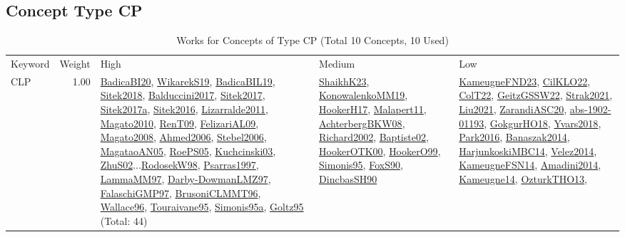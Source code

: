 \subsection{Concept Type CP}
\label{sec:CP}
\label{CP}
{\scriptsize
\begin{longtable}{p{3cm}r>{\raggedright\arraybackslash}p{6cm}>{\raggedright\arraybackslash}p{6cm}>{\raggedright\arraybackslash}p{8cm}}
\rowcolor{white}\caption{Works for Concepts of Type CP (Total 10 Concepts, 10 Used)}\\ \toprule
\rowcolor{white}Keyword & Weight & High & Medium & Low\\ \midrule\endhead
\bottomrule
\endfoot
\index{CLP}\index{CP!CLP}CLP &  1.00 & \hyperref[detail:BadicaBI20]{BadicaBI20}, \hyperref[detail:WikarekS19]{WikarekS19}, \hyperref[detail:BadicaBIL19]{BadicaBIL19}, \hyperref[detail:Sitek2018]{Sitek2018}, \hyperref[detail:Balduccini2017]{Balduccini2017}, \hyperref[detail:Sitek2017]{Sitek2017}, \hyperref[detail:Sitek2017a]{Sitek2017a}, \hyperref[detail:Sitek2016]{Sitek2016}, \hyperref[detail:Lizarralde2011]{Lizarralde2011}, \hyperref[detail:Magato2010]{Magato2010}, \hyperref[detail:RenT09]{RenT09}, \hyperref[detail:FelizariAL09]{FelizariAL09}, \hyperref[detail:Magato2008]{Magato2008}, \hyperref[detail:Ahmed2006]{Ahmed2006}, \hyperref[detail:Stebel2006]{Stebel2006}, \hyperref[detail:MagataoAN05]{MagataoAN05}, \hyperref[detail:RoePS05]{RoePS05}, \hyperref[detail:Kuchcinski03]{Kuchcinski03}, \hyperref[detail:ZhuS02]{ZhuS02}...\hyperref[detail:RodosekW98]{RodosekW98}, \hyperref[detail:Psarras1997]{Psarras1997}, \hyperref[detail:LammaMM97]{LammaMM97}, \hyperref[detail:Darby-DowmanLMZ97]{Darby-DowmanLMZ97}, \hyperref[detail:FalaschiGMP97]{FalaschiGMP97}, \hyperref[detail:BrusoniCLMMT96]{BrusoniCLMMT96}, \hyperref[detail:Wallace96]{Wallace96}, \hyperref[detail:Touraivane95]{Touraivane95}, \hyperref[detail:Simonis95a]{Simonis95a}, \hyperref[detail:Goltz95]{Goltz95} (Total: 44) & \hyperref[detail:ShaikhK23]{ShaikhK23}, \hyperref[detail:KonowalenkoMM19]{KonowalenkoMM19}, \hyperref[detail:HookerH17]{HookerH17}, \hyperref[detail:Malapert11]{Malapert11}, \hyperref[detail:AchterbergBKW08]{AchterbergBKW08}, \hyperref[detail:Richard2002]{Richard2002}, \hyperref[detail:Baptiste02]{Baptiste02}, \hyperref[detail:HookerOTK00]{HookerOTK00}, \hyperref[detail:HookerO99]{HookerO99}, \hyperref[detail:Simonis95]{Simonis95}, \hyperref[detail:FoxS90]{FoxS90}, \hyperref[detail:DincbasSH90]{DincbasSH90} & \hyperref[detail:KameugneFND23]{KameugneFND23}, \hyperref[detail:CilKLO22]{CilKLO22}, \hyperref[detail:ColT22]{ColT22}, \hyperref[detail:GeitzGSSW22]{GeitzGSSW22}, \hyperref[detail:Strak2021]{Strak2021}, \hyperref[detail:Liu2021]{Liu2021}, \hyperref[detail:ZarandiASC20]{ZarandiASC20}, \hyperref[detail:abs-1902-01193]{abs-1902-01193}, \hyperref[detail:GokgurHO18]{GokgurHO18}, \hyperref[detail:Yvars2018]{Yvars2018}, \hyperref[detail:Park2016]{Park2016}, \hyperref[detail:Banaszak2014]{Banaszak2014}, \hyperref[detail:HarjunkoskiMBC14]{HarjunkoskiMBC14}, \hyperref[detail:Velez2014]{Velez2014}, \hyperref[detail:KameugneFSN14]{KameugneFSN14}, \hyperref[detail:Amadini2014]{Amadini2014}, \hyperref[detail:Kameugne14]{Kameugne14}, \hyperref[detail:OzturkTHO13]{OzturkTHO13}, 
\end{longtable}}
